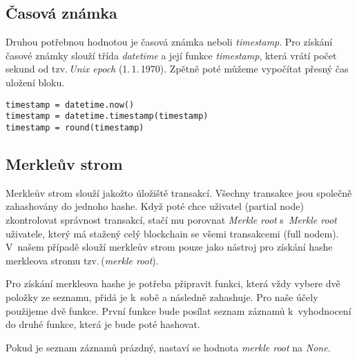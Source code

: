 \documentclass[12pt]{report}			%
\begin{document}
{	\subsection{Časová známka}{
Druhou potřebnou hodnotou je časová známka neboli \textit{timestamp}. Pro získání časové známky slouží třída \textit{datetime} a  její funkce \textit{timestamp}, která vrátí počet sekund od tzv.\,\textit{Unix epoch} (1.\,1.\,1970). Zpětně poté můžeme vypočítat přesný čas uložení bloku. 
\begin{lstlisting}
timestamp = datetime.now()
timestamp = datetime.timestamp(timestamp)
timestamp = round(timestamp)
\end{lstlisting}
}
	\subsection{Merkleův strom}{
Merkleův strom slouží jakožto úložiště transakcí. Všechny transakce jsou společně zahashovány do jednoho hashe. Když poté chce uživatel (partial node) zkontrolovat správnost transakcí, stačí mu porovnat \textit{Merkle root} s~\textit{Merkle root} uživatele, který má stažený celý blockchain se všemi transakcemi (full nodem). V~našem případě slouží merkleův strom pouze jako nástroj pro získání hashe merkleova stromu tzv.\,(\textit{merkle root}).

Pro získání merkleova hashe je potřeba připravit funkci, která vždy vybere dvě položky ze seznamu, přidá je k~sobě a následně zahashuje. Pro naše účely použijeme dvě funkce. První funkce bude posílat seznam záznamů k~vyhodnocení do druhé funkce, která je bude poté hashovat. 

Pokud je seznam záznamů prázdný, nastaví se hodnota \textit{merkle root} na \textit{None}.
	
}}
\end{document}
